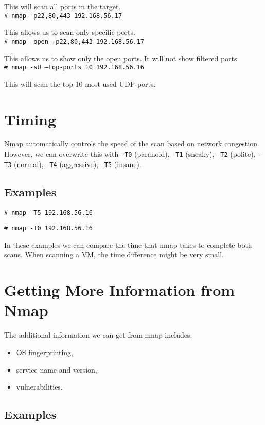 \documentclass[twocolumn]{article}
\begin{document}
This will scan all ports in the target.\\

\texttt{\# nmap -p22,80,443 192.168.56.17}

This allows us to scan only specific ports.\\

\texttt{\# nmap --open -p22,80,443 192.168.56.17}

This allows us to show only the open ports. It will not show filtered ports.\\

\texttt{\# nmap -sU --top-ports 10 192.168.56.16}

This will scan the top-10 most used UDP ports.

\section{Timing}

Nmap automatically controls the speed of the scan based on network congestion. However, we can overwrite this with \texttt{-T0} (paranoid), \texttt{-T1} (sneaky), \texttt{-T2} (polite), \texttt{-T3} (normal), \texttt{-T4} (aggressive), \texttt{-T5} (insane).

\subsection{Examples}

\texttt{\# nmap -T5 192.168.56.16}

\texttt{\# nmap -T0 192.168.56.16}

In these examples we can compare the time that nmap takes to complete both scans. When scanning a VM, the time difference might be very small.


\section{Getting More Information from Nmap}

The additional information we can get from nmap includes:

\begin{itemize}
    \item OS fingerprinting,
    \item service name and version,
    \item vulnerabilities.
\end{itemize}

\subsection{Examples}
\end{document}

